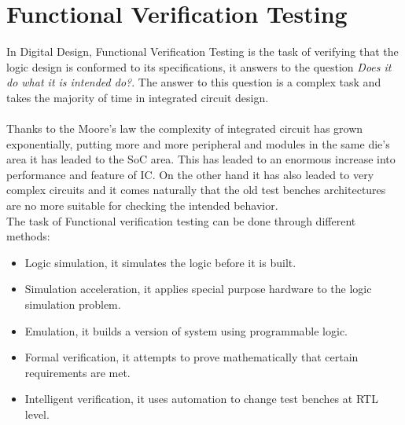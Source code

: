 \chapter{Functional Verification Testing}
\label{fvt}
In Digital Design, Functional Verification Testing is the task of verifying that the logic design is conformed to its specifications, it answers to the question \textit{Does it do what it is intended do?}. The answer to this question is a complex task and takes the majority of time in integrated circuit design.\\\\
Thanks to the Moore's law \cite{paper:1} the complexity of integrated circuit has grown exponentially, putting more and more peripheral and modules in the same die's area it has leaded to the SoC area. This has leaded to an enormous increase into performance and feature of IC. On the other hand it has also leaded to very complex circuits and it comes naturally that the old test benches architectures are no more suitable for checking the intended behavior.\\

The task of Functional verification testing can be done through different methods:
\begin{itemize}
\item Logic simulation, it simulates the logic before it is built.
\item Simulation acceleration, it applies special purpose hardware to the logic simulation problem.
\item Emulation, it builds a version of system using programmable logic.
\item Formal verification, it attempts to prove mathematically that certain requirements are met.
\item Intelligent verification, it uses automation to change test benches at RTL level.
\end{itemize}

